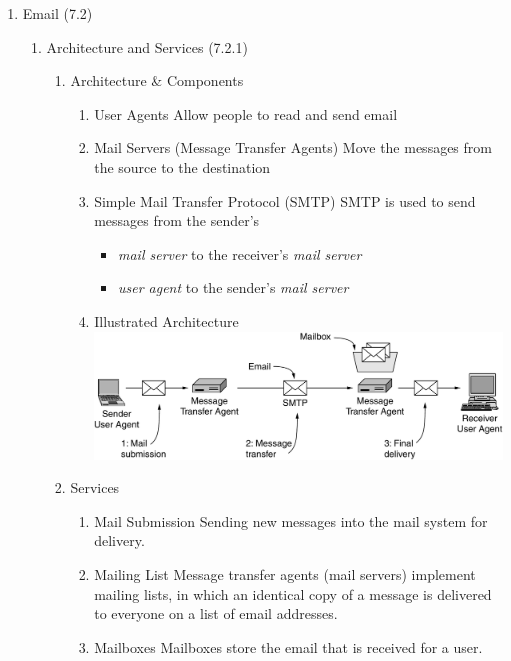 \documentclass[a4paper,10pt]{article}
\begin{document}
\begin{enumerate}
  \item Email (7.2)
    \begin{enumerate}
      \item Architecture and Services (7.2.1)
        \begin{enumerate}
          \item Architecture \& Components
            \begin{enumerate}
              \item User Agents
                \newline Allow people to read and send email
              \item Mail Servers (Message Transfer Agents)
                \newline Move the messages from the source to the destination
              \item Simple Mail Transfer Protocol (SMTP)
                \newline SMTP is used to send messages from the sender's
                \begin{itemize}
                  \item \textit{mail server} to the receiver's \textit{mail server}
                  \item \textit{user agent} to the sender's \textit{mail server}
                \end{itemize}
              \item Illustrated Architecture
                \newline\includegraphics[width=\textwidth]{emailsystem}
            \end{enumerate}
          \item Services
            \begin{enumerate}
              \item Mail Submission
                \newline Sending new messages into the mail system for delivery.
              \item Mailing List
                \newline Message transfer agents (mail servers) implement mailing lists, in which an identical copy of a message is delivered to everyone on a list of email addresses.
              \item Mailboxes
                \newline Mailboxes store the email that is received for a user.
            \end{enumerate}
        \end{enumerate}


\end{enumerate}
\end{enumerate}
\end{document}
